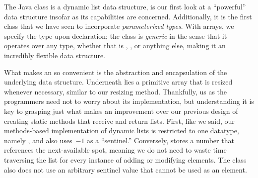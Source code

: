 The Java  class is a dynamic list data structure, is our first look at a ``powerful'' data structure insofar as its capabilities are concerned. 
Additionally, it is the first class that we have seen to incorporate \emph{parameterized types}. 
With arrays, we specify the type upon declaration; the  class is \emph{generic} in the sense that it operates over any type, whether that is , , or anything else, making it an incredibly flexible data structure. 

What makes an  so convenient is the abstraction and encapsulation of the underlying data structure. 
Underneath lies a primitive array that is resized whenever necessary, similar to our resizing method. 
Thankfully, us as the programmers need not to worry about its implementation, but understanding it is key to grasping just what makes an improvement over our previous design of creating static methods that receive and return lists. 
First, like we said, our methods-based implementation of dynamic lists is restricted to one datatype, namely , and also uses~$-1$ as a ``sentinel.'' 
Conversely,  stores a number that references the next-available spot, meaning we do not need to waste time traversing the list for every instance of adding or modifying elements. 
The  class also does not use an arbitrary sentinel value that cannot be used as an element.

